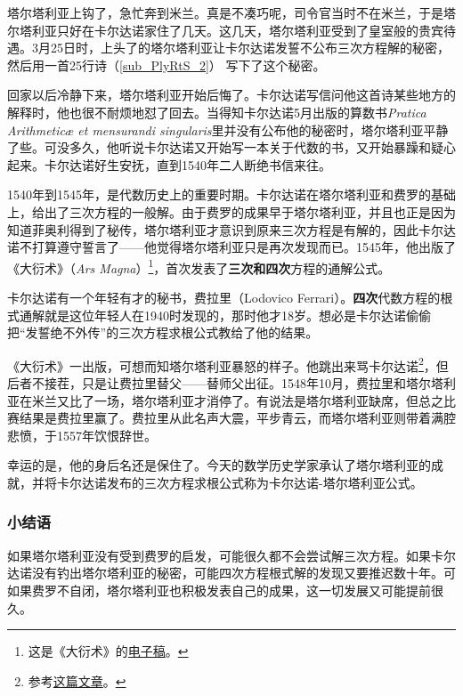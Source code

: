 塔尔塔利亚上钩了，急忙奔到米兰。真是不凑巧呢，司令官当时不在米兰，于是塔尔塔利亚只好在卡尔达诺家住了几天。这几天，塔尔塔利亚受到了皇室般的贵宾待遇。3月25日时，上头了的塔尔塔利亚让卡尔达诺发誓不公布三次方程解的秘密，然后用一首25行诗（\autoref{sub_PlyRtS_2}） 写下了这个秘密。

回家以后冷静下来，塔尔塔利亚开始后悔了。卡尔达诺写信问他这首诗某些地方的解释时，他也很不耐烦地怼了回去。当得知卡尔达诺5月出版的算数书\textsl{Pratica Arithmeticæ et mensurandi singularis}里并没有公布他的秘密时，塔尔塔利亚平静了些。可没多久，他听说卡尔达诺又开始写一本关于代数的书，又开始暴躁和疑心起来。卡尔达诺好生安抚，直到1540年二人断绝书信来往。

1540年到1545年，是代数历史上的重要时期。卡尔达诺在塔尔塔利亚和费罗的基础上，给出了三次方程的一般解。由于费罗的成果早于塔尔塔利亚，并且也正是因为知道菲奥利得到了秘传，塔尔塔利亚才意识到原来三次方程是有解的，因此卡尔达诺不打算遵守誓言了——他觉得塔尔塔利亚只是再次发现而已。1545年，他出版了《大衍术》（\textsl{Ars Magna}）\footnote{这是《大衍术》的\href{https://web.archive.org/web/20220201093634/http://www.filosofia.unimi.it/cardano/testi/operaomnia/vol_4_s_4.pdf}{电子稿}。}，首次发表了\textbf{三次和四次}方程的通解公式。

卡尔达诺有一个年轻有才的秘书，费拉里（Lodovico Ferrari）。\textbf{四次}代数方程的根式通解就是这位年轻人在1940时发现的，那时他才18岁。想必是卡尔达诺偷偷把“发誓绝不外传”的三次方程求根公式教给了他的结果。

《大衍术》一出版，可想而知塔尔塔利亚暴怒的样子。他跳出来骂卡尔达诺\footnote{参考\href{https://arxiv.org/ftp/arxiv/papers/1308/1308.2181.pdf}{这篇文章}。}，但后者不接茬，只是让费拉里替父——替师父出征。1548年10月，费拉里和塔尔塔利亚在米兰又比了一场，塔尔塔利亚才消停了。有说法是塔尔塔利亚缺席，但总之比赛结果是费拉里赢了。费拉里从此名声大震，平步青云，而塔尔塔利亚则带着满腔悲愤，于1557年饮恨辞世。

幸运的是，他的身后名还是保住了。今天的数学历史学家承认了塔尔塔利亚的成就，并将卡尔达诺发布的三次方程求根公式称为卡尔达诺-塔尔塔利亚公式。






\subsubsection{小结语}

如果塔尔塔利亚没有受到费罗的启发，可能很久都不会尝试解三次方程。如果卡尔达诺没有钓出塔尔塔利亚的秘密，可能四次方程根式解的发现又要推迟数十年。可如果费罗不自闭，塔尔塔利亚也积极发表自己的成果，这一切发展又可能提前很久。

